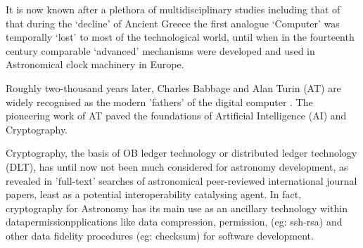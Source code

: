 \documentclass[final,5p,times,twocolumn,authoryear]{elsarticle}
\begin{document}
 It is now known after a plethora of multidisciplinary studies including that of \cite{Freeth2021} that during the `decline' of Ancient Greece the first analogue `Computer' was temporally `lost' to most of the technological world, until when in the fourteenth century comparable `advanced' mechanisms were developed and used in Astronomical clock machinery in Europe. 
 
 Roughly two-thousand years later, Charles Babbage and Alan Turin (AT) are widely recognised as the modern 'fathers' of the digital computer \citep{swa2017}. The pioneering work of AT paved the foundations of Artificial Intelligence (AI) and Cryptography. 
 
Cryptography, the basis of OB ledger technology or distributed ledger technology (DLT), has until now not been much considered for astronomy development, as revealed in 'full-text' searches of astronomical peer-reviewed international journal papers, least as a potential interoperability catalysing agent. In fact, cryptography for Astronomy has its main use as an ancillary technology within datapermissionpplications like data compression, permission, (eg: ssh-rsa) and other data fidelity procedures (eg: checksum) for software development.
\end{document}
